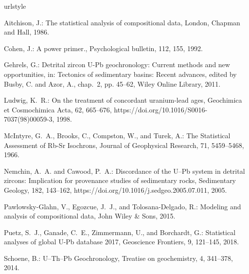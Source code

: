 \documentclass{article}
\begin{document}
\begin{thebibliography}{14}
\providecommand{\natexlab}[1]{#1}
\providecommand{\url}[1]{{\tt #1}}
\providecommand{\urlprefix}{URL }
\expandafter\ifx\csname urlstyle\endcsname\relax
  \providecommand{\doi}[1]{https://doi.org/\discretionary{}{}{}#1}\else
  \providecommand{\doi}{https://doi.org/\discretionary{}{}{}\begingroup
  \urlstyle{rm}\Url}\fi

Aitchison, J.: The statistical analysis of compositional data, London, Chapman
  and Hall, 1986.

Cohen, J.: A power primer., Psychological bulletin, 112, 155, 1992.

Gehrels, G.: {Detrital zircon U-Pb geochronology: Current methods and new
  opportunities}, in: Tectonics of sedimentary basins: Recent advances, edited
  by Busby, C. and Azor, A., chap.~2, pp. 45--62, Wiley Online Library, 2011.

{Ludwig}, K.~R.: {On the treatment of concordant uranium-lead ages}, Geochimica
  et Cosmochimica Acta, 62, 665--676, \doi{10.1016/S0016-7037(98)00059-3},
  1998.

{McIntyre}, G.~A., {Brooks}, C., {Compston}, W., and {Turek}, A.: {The
  Statistical Assessment of Rb-Sr Isochrons}, Journal of Geophysical Research,
  71, 5459--5468, 1966.

{Nemchin}, A.~A. and {Cawood}, P.~A.: {Discordance of the U--Pb system in
  detrital zircons: Implication for provenance studies of sedimentary rocks},
  Sedimentary Geology, 182, 143--162, \doi{10.1016/j.sedgeo.2005.07.011}, 2005.

Pawlowsky-Glahn, V., Egozcue, J.~J., and Tolosana-Delgado, R.: Modeling and
  analysis of compositional data, John Wiley \& Sons, 2015.

Puetz, S.~J., Ganade, C.~E., Zimmermann, U., and Borchardt, G.: {Statistical
  analyses of global U-Pb database 2017}, Geoscience Frontiers, 9, 121--145,
  2018.

Schoene, B.: U--Th--Pb Geochronology, Treatise on geochemistry, 4, 341--378,
  2014.


\end{thebibliography}
\end{document}
